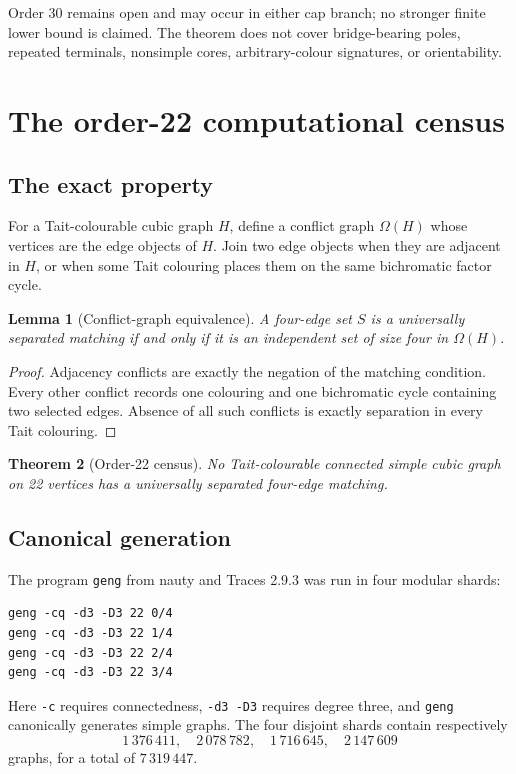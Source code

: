 \documentclass[11pt]{article}
\newtheorem{theorem}{Theorem}[section]
\newtheorem{lemma}[theorem]{Lemma}
\theoremstyle{definition}
\theoremstyle{remark}
\begin{document}
Order 30 remains open and may occur in either cap branch; no stronger
finite lower bound is claimed.
The theorem does not cover bridge-bearing poles, repeated terminals,
nonsimple cores, arbitrary-colour signatures, or orientability.

\section{The order-22 computational census}

\subsection{The exact property}

For a Tait-colourable cubic graph \(H\), define a conflict graph
\(\Omega(H)\) whose vertices are the edge objects of \(H\).  Join two
edge objects when they are adjacent in \(H\), or when some Tait
colouring places them on the same bichromatic factor cycle.

\begin{lemma}[Conflict-graph equivalence]\label{lem:conflict}
A four-edge set \(S\) is a universally separated matching if and only if
it is an independent set of size four in \(\Omega(H)\).
\end{lemma}

\begin{proof}
Adjacency conflicts are exactly the negation of the matching condition.
Every other conflict records one colouring and one bichromatic cycle
containing two selected edges.  Absence of all such conflicts is exactly
separation in every Tait colouring.
\end{proof}

\begin{theorem}[Order-22 census]\label{thm:census}
No Tait-colourable connected simple cubic graph on 22 vertices has a
universally separated four-edge matching.
\end{theorem}

\subsection{Canonical generation}

The program \texttt{geng} from nauty and Traces 2.9.3
\cite{McKayPiperno2014} was run in four modular shards:
\begin{verbatim}
geng -cq -d3 -D3 22 0/4
geng -cq -d3 -D3 22 1/4
geng -cq -d3 -D3 22 2/4
geng -cq -d3 -D3 22 3/4
\end{verbatim}
Here \texttt{-c} requires connectedness, \texttt{-d3 -D3} requires
degree three, and \texttt{geng} canonically generates simple graphs.
The four disjoint shards contain respectively
\[
 1\,376\,411,\quad 2\,078\,782,\quad
 1\,716\,645,\quad 2\,147\,609
\]
graphs, for a total of \(7\,319\,447\).
\end{document}
